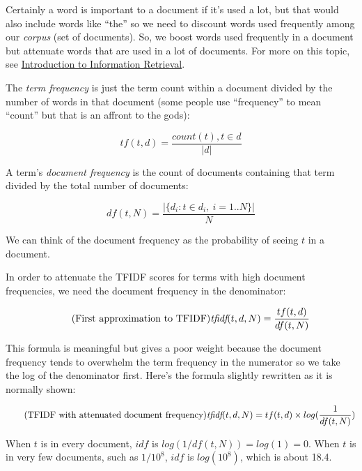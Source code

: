 \begin{fullwidth}
Certainly a word is important to a document if it's used a lot, but that would also include words like ``the'' so we need to discount words used frequently among our {\em corpus} (set of documents). So, we boost words used frequently in a document but attenuate words that are used  in a lot of documents.  For more on this topic, see \href{http://nlp.stanford.edu/IR-book/html/htmledition/term-frequency-and-weighting-1.html}{Introduction to Information Retrieval}.

The {\em term frequency} is just the term count within a document divided by the number of words in that document (some people use ``frequency'' to mean ``count'' but that is an affront to the gods):

\[\tag{Term frequency of term $t$, document $d$}
tf(t,d) = \frac{count(t), t \in d}{|d|}
\]

A term's {\em document frequency} is the count of documents containing that term divided by the total number of documents:

\[\tag{Document frequency of $t$ in $N$ documents}
df(t,N) = \frac{|\{d_i : t \in d_i, \ i = 1..N\}|}{N}
\]

\noindent We can think of the document frequency as the probability of seeing $t$ in a document.

In order to attenuate the TFIDF scores for terms with high document frequencies, we need the document frequency  in the denominator:

\[\tag{First approximation to TFIDF}
\text{\em tfidf}(t,d,N) = \frac{tf(t,d)}{df(t,N)}
\]

This formula is  meaningful but gives a poor weight because the document frequency tends to overwhelm the term frequency in the numerator so we take the log of the denominator first.  Here's the formula slightly rewritten as it is normally shown:

\[\tag{TFIDF with attenuated document frequency}
\text{\em tfidf}(t,d,N) = tf(t,d) \times log(\frac{1}{df(t,N)})
\]

\noindent When $t$ is in every document, $idf$ is $log(1/df(t,N)) = log(1) = 0$. When $t$ is in very few documents, such as $1/10^8$, $idf$ is $log(10^8)$, which is about 18.4.

\begin{center}
\end{center}
\end{fullwidth}
